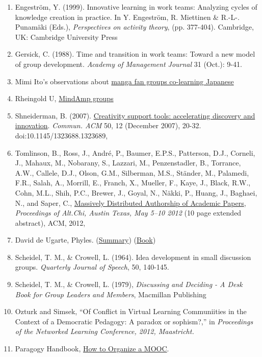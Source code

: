 \begin{enumerate}
\item
  Engeström, Y. (1999). Innovative learning in work teams: Analyzing
  cycles of knowledge creation in practice. In Y. Engeström, R.
  Miettinen \& R.-L-. Punamäki (Eds.), \emph{Perspectives on activity
  theory}, (pp. 377-404). Cambridge, UK: Cambridge University Press
\item
  Gersick, C. (1988). Time and transition in work teams: Toward a new
  model of group development. \emph{Academy of Management Journal} 31
  (Oct.): 9-41.
\item
  Mimi Ito's observations about
  \href{http://mitpress.mit.edu/books/full\_pdfs/hanging\_out.pdf}{manga
  fan groups co-learning Japanese}
\item
  Rheingold U,
  \href{http://socialmediaclassroom.com/host/mindamp5/lockedwiki/main-page}{MindAmp
  groups}
\item
  Shneiderman, B. (2007).
  \href{http://doi.acm.org/10.1145/1323688.1323689}{Creativity support
  tools: accelerating discovery and innovation}. \emph{Commun. ACM} 50,
  12 (December 2007), 20-32. doi:10.1145/1323688.1323689,
\item
  Tomlinson, B., Ross, J., André, P., Baumer, E.P.S., Patterson, D.J.,
  Corneli, J., Mahaux, M., Nobarany, S., Lazzari, M., Penzenstadler, B.,
  Torrance, A.W., Callele, D.J., Olson, G.M., Silberman, M.S., Ständer,
  M., Palamedi, F.R., Salah, A., Morrill, E., Franch, X., Mueller, F.,
  Kaye, J., Black, R.W., Cohn, M.L., Shih, P.C., Brewer, J., Goyal, N.,
  Näkki, P., Huang, J., Baghaei, N., and Saper, C.,
  \href{http://altchi.org/submissions/submission\_wmt\_0.pdf}{Massively
  Distributed Authorship of Academic Papers}, \emph{Proceedings of
  Alt.Chi, Austin Texas, May 5--10 2012} (10 page extended abstract),
  ACM, 2012,
\item
  David de Ugarte, Phyles.
  (\href{http://david.lasindias.com/phyles/}{Summary})
  (\href{http://deugarte.com/gomi/phyles.pdf}{Book})
\item
  Scheidel, T. M., \& Crowell, L. (1964). Idea development in small
  discussion groups. \emph{Quarterly Journal of Speech}, 50, 140-145.
\item
  Scheidel, T. M., \& Crowell, L. (1979), \emph{Discussing and Deciding
  - A Desk Book for Group Leaders and Members}, Macmillan Publishing
\item
  Ozturk and Simsek, ``Of Conflict in Virtual Learning Communiities in
  the Context of a Democratic Pedagogy: A paradox or sophism?,'' in
  \emph{Proceedings of the Networked Learning Conference, 2012,
  Maastricht.}
\item
  Paragogy Handbook,
  \href{http://peeragogy.org/organizing-a-learning-context/connectivism-in-practice-how-to-organize-a-mooc/}{How
  to Organize a MOOC}.
\end{enumerate}
